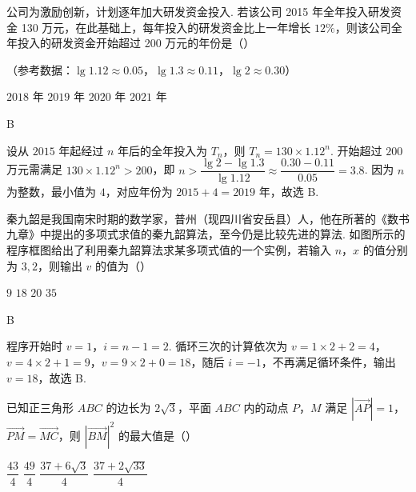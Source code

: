 \begin{problem}
公司为激励创新，计划逐年加大研发资金投入. 若该公司 2015 年全年投入研发资金 130 万元，在此基础上，每年投入的研发资金比上一年增长 \(12\%\)，则该公司全年投入的研发资金开始超过 200 万元的年份是（\quad）

（参考数据：\(\lg 1.12\approx0.05\)，\(\lg 1.3\approx0.11\)，\(\lg 2\approx0.30\)）

\choices
    {\(2018\) 年}
    {\(2019\) 年}
    {\(2020\) 年}
    {\(2021\) 年}
\end{problem}

\begin{answer}
B
\end{answer}

\begin{solution}
设从 \(2015\) 年起经过 \(n\) 年后的全年投入为 \(T_n\)，则 \(T_n=130\times1.12^n\). 开始超过 \(200\) 万元需满足
\(130\times1.12^n>200\)，即
\(n>\dfrac{\lg2-\lg1.3}{\lg1.12}\approx\dfrac{0.30-0.11}{0.05}=3.8\).
因为 \(n\) 为整数，最小值为 \(4\)，对应年份为 \(2015+4=2019\) 年，故选 B.
\end{solution}

\begin{problem}
秦九韶是我国南宋时期的数学家，普州（现四川省安岳县）人，他在所著的《数书九章》中提出的多项式求值的秦九韶算法，至今仍是比较先进的算法. 如图所示的程序框图给出了利用秦九韶算法求某多项式值的一个实例，若输入 \(n\)，\(x\) 的值分别为 \(3,2\)，则输出 \(v\) 的值为（\quad）


\choices
    {\(9\)}
    {\(18\)}
    {\(20\)}
    {\(35\)}
\end{problem}

\begin{answer}
B
\end{answer}

\begin{solution}
程序开始时 \(v=1\)，\(i=n-1=2\). 循环三次的计算依次为
\(v=1\times2+2=4\)，\(v=4\times2+1=9\)，\(v=9\times2+0=18\)，随后 \(i=-1\)，不再满足循环条件，输出 \(v=18\)，故选 B.
\end{solution}

\begin{problem}
已知正三角形 \(ABC\) 的边长为 \(2\sqrt3\)，平面 \(ABC\) 内的动点 \(P\)，\(M\) 满足 \(\left| \overrightarrow{AP} \right|=1\)，\(\overrightarrow{PM}=\overrightarrow{MC}\)，则 \(\left| \overrightarrow{BM} \right|^2\) 的最大值是（\quad）

\choices
    {\(\dfrac{43}{4}\)}
    {\(\dfrac{49}{4}\)}
    {\(\dfrac{37+6\sqrt3}{4}\)}
    {\(\dfrac{37+2\sqrt{33}}{4}\)}
\end{problem}

